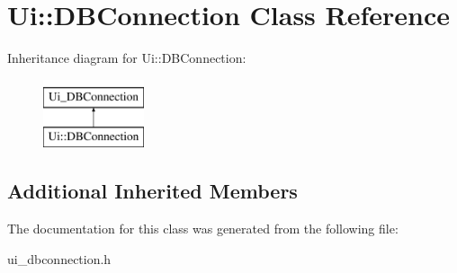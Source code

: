 \hypertarget{classUi_1_1DBConnection}{\section{Ui\-:\-:D\-B\-Connection Class Reference}
\label{classUi_1_1DBConnection}
}
Inheritance diagram for Ui\-:\-:D\-B\-Connection\-:\begin{figure}[H]
\begin{center}
\leavevmode
\includegraphics[height=2.000000cm]{classUi_1_1DBConnection}
\end{center}
\end{figure}
\subsection*{Additional Inherited Members}


The documentation for this class was generated from the following file\-:\begin{DoxyCompactItemize}
\item 
ui\-\_\-dbconnection.\-h\end{DoxyCompactItemize}
